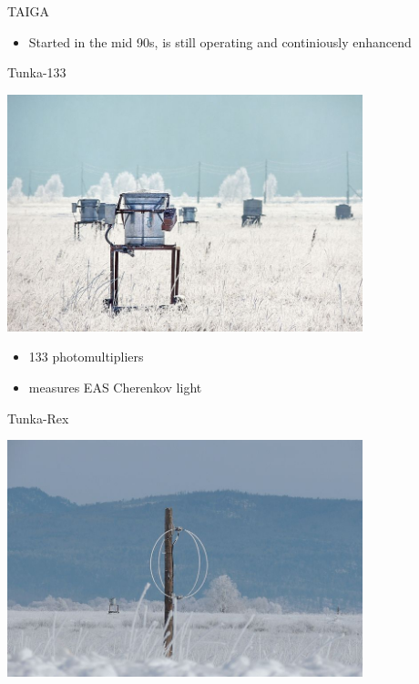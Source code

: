 \begin{frame}{TAIGA}
\footnotesize
\vspace{-1em}
\begin{itemize}
 \item Started in the mid 90s, is still operating and continiously enhancend
\end{itemize}
\vspace{-2em}
\begin{minipage}[t]{0.31\textwidth}
  \begin{block}{\small Tunka-133}
    \parbox[c][0.20\textheight][t]{1\textwidth}{
      \centering
      \includegraphics[width=0.7742\textwidth]{pics/Tunka-133.jpg}
    }
    \hfill
    \parbox[c][0.15\textheight][t]{1\textwidth}{
      \begin{itemize}
        \setlength{\itemsep}{0pt}
        \item 133 photomultipliers
        \item measures EAS Cherenkov light
      \end{itemize}
    }
  \end{block}
\end{minipage}
\hfill
\begin{minipage}[t]{0.31\textwidth}
  \begin{block}{\small Tunka-Rex}
    \parbox[c][0.20\textheight][t]{1\textwidth}{
      \centering
      \includegraphics[width=0.7742\textwidth]{pics/Tunka-Rex.jpg}
}
\end{block}
\end{minipage}
\end{frame}
